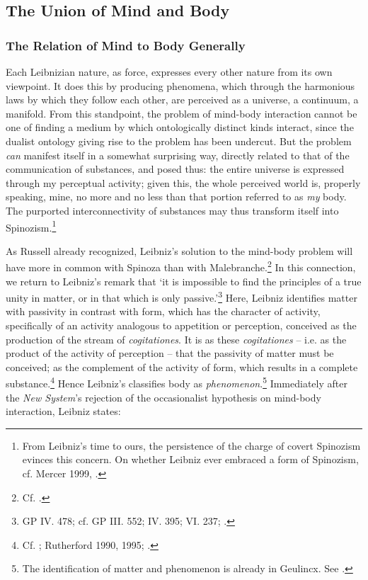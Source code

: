 \documentclass{article}
\begin{document}
\subsection{The Union of Mind and
Body}

\subsubsection{The Relation of Mind to Body
Generally}
Each Leibnizian nature, as force, expresses every other nature from its
own viewpoint. It does this by producing phenomena, which through the
harmonious laws by which they follow each other, are perceived as a
universe, a continuum, a manifold. From this standpoint, the problem of
mind-body interaction cannot be one of finding a medium by which
ontologically distinct kinds interact, since the dualist ontology giving
rise to the problem has been undercut. But the problem \emph{can}
manifest itself in a somewhat surprising way, directly related to that
of the communication of substances, and posed thus: the entire universe
is expressed through my perceptual activity; given this, the whole
perceived world is, properly speaking, mine, no more and no less than
that portion referred to as \emph{my} body. The purported
interconnectivity of substances may thus transform itself into
Spinozism.\footnote{From Leibniz's time to ours, the persistence of the
  charge of covert Spinozism evinces this concern. On whether Leibniz
  ever embraced a form of Spinozism, cf. Mercer 1999, \autocite{Kulstad2002}.}

As Russell already recognized, Leibniz's solution to the mind-body
problem will have more in common with Spinoza than with
Malebranche.\footnote{Cf. \autocite[139]{Russell1951}.} In this connection, we
return to Leibniz's remark that `it is impossible to find the principles
of a true unity in matter, or in that which is only passive.'\footnote{GP
  IV. 478; cf. GP III. 552; IV. 395; VI. 237; \autocite[30-31]{Howard2017}.}
Here, Leibniz identifies matter with passivity in contrast with form,
which has the character of activity, specifically of an activity
analogous to appetition or perception, conceived as the production of
the stream of \emph{cogitationes}. It is as these \emph{cogitationes} --
i.e. as the product of the activity of perception -- that the passivity
of matter must be conceived; as the complement of the activity of form,
which results in a complete substance.\footnote{Cf. \autocite{Furth1967};
  Rutherford 1990, 1995; \autocite{Adams1994}.} Hence Leibniz's classifies body as
\emph{phenomenon}.\footnote{The identification of matter and phenomenon
  is already in Geulincx. See \autocite[179]{Cooney1978}.} Immediately after the
\emph{New System}'s rejection of the occasionalist hypothesis on
mind-body interaction, Leibniz states:
\end{document}
